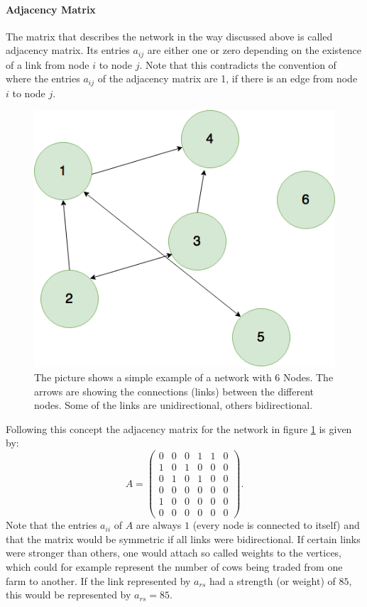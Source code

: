 \paragraph{Adjacency Matrix}
The matrix that describes the network in the way discussed above is called adjacency matrix. Its entries $a_{ij}$ are either one or zero depending on the existence of a link from node $i$ to node $j$. Note that this contradicts the convention of \citep{BAR16} where the entries $a_{ij}$ of the adjacency matrix are 1, if there is an edge from node $i$ to node $j$.
\begin{figure}[htbp]
\centering
\noindent\includegraphics[width=0.4\linewidth,height=\textheight,
keepaspectratio]{Graph.png} 
\caption[Graph Example]{The picture shows  a simple example of a network with 6 Nodes. The arrows are showing the connections (links) between the different nodes. Some of the links are unidirectional, others bidirectional.}
\label{fig:simpleNetwork}
\end{figure}
Following this concept the adjacency matrix for the network in figure \ref{fig:simpleNetwork} is given by:
\begin{equation}
A = \left( \begin{matrix}
 0 & 0 & 0 & 1 & 1 & 0\\
 1 & 0 & 1 & 0 & 0 & 0\\
 0 & 1 & 0 & 1 & 0 & 0\\
 0 & 0 & 0 & 0 & 0 & 0\\
 1 & 0 & 0 & 0 & 0 & 0\\
 0 & 0 & 0 & 0 & 0 & 0
 \end{matrix}
 \right). \label{eq:adjMatExamp}
\end{equation}
Note that the entries $a_{ii}$ of $A$ are always $1$ (every node is connected to itself) and that the matrix would be symmetric if all links were bidirectional. 
If certain links were stronger than others, one would attach so called weights to the vertices, which could for example represent the number of cows being traded from one farm to another. If the link represented by $a_{rs}$ had a strength (or weight) of $85$, this would be represented by $a_{rs}= 85$. 

